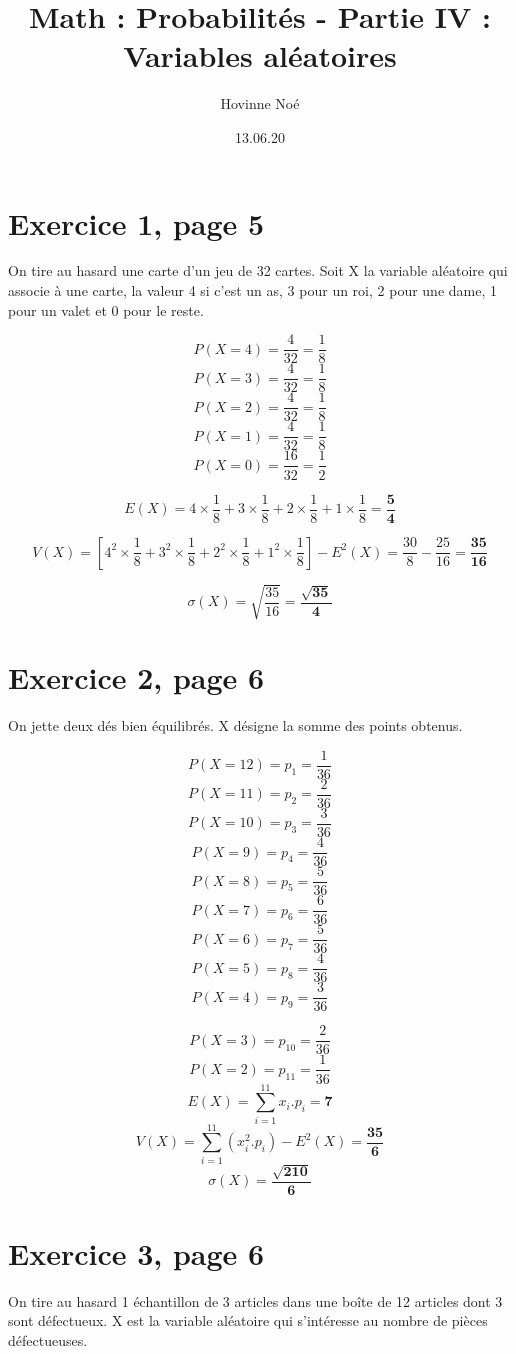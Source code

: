 \documentclass[10pt]{article}
\begin{document}
\title{Math : Probabilités - Partie IV : Variables aléatoires}
\author{Hovinne Noé}
\date{13.06.20}
\maketitle
\section*{Exercice 1, page 5}
On tire au hasard une carte d’un jeu de 32 cartes. Soit X la variable aléatoire qui
associe à une carte, la valeur 4 si c’est un as, 3 pour un roi, 2 pour une dame, 1 pour
un valet et 0 pour le reste.

$$P(X=4)=\frac{4}{32}=\frac{1}{8}$$
$$P(X=3)=\frac{4}{32}=\frac{1}{8}$$
$$P(X=2)=\frac{4}{32}=\frac{1}{8}$$
$$P(X=1)=\frac{4}{32}=\frac{1}{8}$$
$$P(X=0)=\frac{16}{32}=\frac{1}{2}$$


$$E(X)=4\times\frac{1}{8}+3\times\frac{1}{8}+2\times\frac{1}{8}+1\times\frac{1}{8}=\frac{\textbf{5}}{\textbf{4}}$$

$$V(X)=\left[4^2\times\frac{1}{8}+3^2\times\frac{1}{8}+2^2\times\frac{1}{8}+1^2\times\frac{1}{8}\right]-E^2(X)=\frac{30}{8}-\frac{25}{16}=\frac{\textbf{35}}{\textbf{16}}$$

$$\sigma(X)=\sqrt{\frac{35}{16}}=\frac{\sqrt{\textbf{35}}}{\textbf{4}}$$
\section*{Exercice 2, page 6}
On jette deux dés bien équilibrés. X désigne la somme des points obtenus.

$$P(X=12)=p_1=\frac{1}{36}$$
$$P(X=11)=p_2=\frac{2}{36}$$
$$P(X=10)=p_3=\frac{3}{36}$$
$$P(X=9)=p_4=\frac{4}{36}$$
$$P(X=8)=p_5=\frac{5}{36}$$
$$P(X=7)=p_6=\frac{6}{36}$$
$$P(X=6)=p_7=\frac{5}{36}$$
$$P(X=5)=p_8=\frac{4}{36}$$
$$P(X=4)=p_9=\frac{3}{36}$$

\newpage
$$P(X=3)=p_{10}=\frac{2}{36}$$
$$P(X=2)=p_{11}=\frac{1}{36}$$
$$E(X)=\sum_{i=1}^{11}x_i.p_i=\textbf{7}$$
$$V(X)=\sum_{i=1}^{11}(x_i^2.p_i)-E^2(X)=\frac{\textbf{35}}{\textbf{6}}$$
$$\sigma(X)=\frac{\sqrt{\textbf{210}}}{\textbf{6}}$$
\section*{Exercice 3, page 6}
On tire au hasard 1 échantillon de 3 articles dans une boîte de 12 articles dont 3 sont défectueux. X est la variable aléatoire qui s'intéresse au nombre de pièces défectueuses.
\end{document}
